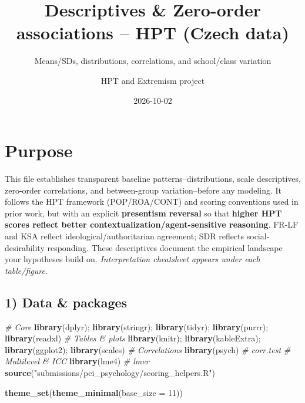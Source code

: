 \documentclass[
  10pt,
]{article}
\title{Descriptives \& Zero-order associations -- HPT (Czech data)}
\subtitle{Means/SDs, distributions, correlations, and school/class
variation}
\author{HPT and Extremism project}
\date{2026-10-02}
\newenvironment{Shaded}{\begin{snugshade}}{\end{snugshade}}
\newcommand{\AttributeTok}[1]{\textcolor[rgb]{0.13,0.29,0.53}{#1}}
\newcommand{\CommentTok}[1]{\textcolor[rgb]{0.56,0.35,0.01}{\textit{#1}}}
\newcommand{\DecValTok}[1]{\textcolor[rgb]{0.00,0.00,0.81}{#1}}
\newcommand{\FunctionTok}[1]{\textcolor[rgb]{0.13,0.29,0.53}{\textbf{#1}}}
\newcommand{\NormalTok}[1]{#1}
\newcommand{\StringTok}[1]{\textcolor[rgb]{0.31,0.60,0.02}{#1}}
\begin{document}
\maketitle

{
\setcounter{tocdepth}{3}
\tableofcontents
}
\hypertarget{purpose}{%
\section{Purpose}\label{purpose}}

This file establishes transparent baseline patterns--distributions,
scale descriptives, zero-order correlations, and between-group
variation--before any modeling. It follows the HPT framework
(POP/ROA/CONT) and scoring conventions used in prior work, but with an
explicit \textbf{presentism reversal} so that \textbf{higher HPT scores
reflect better contextualization/agent-sensitive reasoning}. FR-LF and
KSA reflect ideological/authoritarian agreement; SDR reflects
social-desirability responding. These descriptives document the
empirical landscape your hypotheses build on. \emph{Interpretation
cheatsheet appears under each table/figure.}

\hypertarget{data-packages}{%
\subsection{1) Data \& packages}\label{data-packages}}

\begin{Shaded}
\begin{Highlighting}[]
\CommentTok{\# Core}
\FunctionTok{library}\NormalTok{(dplyr); }\FunctionTok{library}\NormalTok{(stringr); }\FunctionTok{library}\NormalTok{(tidyr); }\FunctionTok{library}\NormalTok{(purrr); }\FunctionTok{library}\NormalTok{(readxl)}
\CommentTok{\# Tables \& plots}
\FunctionTok{library}\NormalTok{(knitr); }\FunctionTok{library}\NormalTok{(kableExtra); }\FunctionTok{library}\NormalTok{(ggplot2); }\FunctionTok{library}\NormalTok{(scales)}
\CommentTok{\# Correlations}
\FunctionTok{library}\NormalTok{(psych)           }\CommentTok{\# corr.test}
\CommentTok{\# Multilevel \& ICC}
\FunctionTok{library}\NormalTok{(lme4)            }\CommentTok{\# lmer}
\FunctionTok{source}\NormalTok{(}\StringTok{"submissions/pci\_psychology/scoring\_helpers.R"}\NormalTok{)}

\FunctionTok{theme\_set}\NormalTok{(}\FunctionTok{theme\_minimal}\NormalTok{(}\AttributeTok{base\_size =} \DecValTok{11}\NormalTok{))}
\end{Highlighting}
\end{Shaded}
\end{document}

